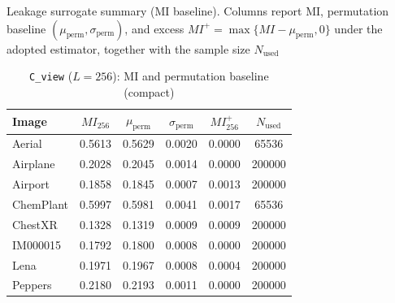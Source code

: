 \begin{table}[ht!]
\centering
\caption{Leakage surrogate summary (MI baseline). Columns report MI, permutation baseline
$(\mu_{\mathrm{perm}},\sigma_{\mathrm{perm}})$, and excess $MI^{+}= \max\{MI-\mu_{\mathrm{perm}},0\}$
under the adopted estimator, together with the sample size $N_{\mathrm{used}}$}
\label{stab:leakage_main}

{\scriptsize
\begin{subtable}[t]{\columnwidth}
\caption{\texttt{C\_view} ($L=256$): MI and permutation baseline (compact)}
\label{stab:mi_z256_compact}
\centering
\begin{tabular*}{\columnwidth}{@{\extracolsep{\fill}}l
    S[table-format=1.4]
    S[table-format=1.4]
    S[table-format=1.4]
    S[table-format=1.4]
    S[table-format=6.0] @{}}
\hline
\textbf{Image} &
 &
 &
 &
 &
 \\
\hline
Aerial     & 0.5613 & 0.5629 & 0.0020 & 0.0000 &  65536 \\
Airplane   & 0.2028 & 0.2045 & 0.0014 & 0.0000 & 200000 \\
Airport    & 0.1858 & 0.1845 & 0.0007 & 0.0013 & 200000 \\
ChemPlant  & 0.5997 & 0.5981 & 0.0041 & 0.0017 &  65536 \\
ChestXR    & 0.1328 & 0.1319 & 0.0009 & 0.0009 & 200000 \\
IM000015   & 0.1792 & 0.1800 & 0.0008 & 0.0000 & 200000 \\
Lena       & 0.1971 & 0.1967 & 0.0008 & 0.0004 & 200000 \\
Peppers    & 0.2180 & 0.2193 & 0.0011 & 0.0000 & 200000 \\
\hline
\end{tabular*}
\end{subtable}

\vspace{0.35em}

}
\end{table}
